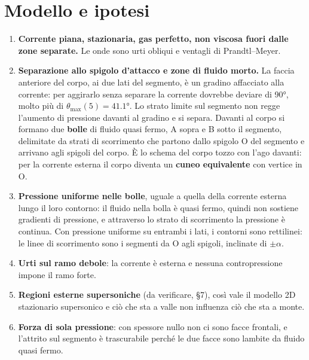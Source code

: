 \documentclass[11pt,a4paper]{article}
\begin{document}
\section{Modello e ipotesi}
\begin{enumerate}
\item \textbf{Corrente piana, stazionaria, gas perfetto, non viscosa fuori dalle zone separate.} Le onde sono urti
  obliqui e ventagli di Prandtl--Meyer.
\item \textbf{Separazione allo spigolo d'attacco e zone di fluido morto.} La faccia anteriore del corpo, ai due lati
  del segmento, è un gradino affacciato alla corrente: per aggirarlo senza separare la corrente dovrebbe deviare di
  \ang{90}, molto più di $\theta_{\max}(5)=\ang{41.1}$. Lo strato limite sul segmento non regge l'aumento di pressione
  davanti al gradino e si separa. Davanti al corpo si formano due \textbf{bolle} di fluido quasi fermo, A sopra e B
  sotto il segmento, delimitate da strati di scorrimento che partono dallo spigolo O del segmento e arrivano agli
  spigoli del corpo. È lo schema del corpo tozzo con l'ago davanti: per la corrente esterna il corpo diventa un
  \textbf{cuneo equivalente} con vertice in O.
\item \textbf{Pressione uniforme nelle bolle}, uguale a quella della corrente esterna lungo il loro contorno: il
  fluido nella bolla è quasi fermo, quindi non sostiene gradienti di pressione, e attraverso lo strato di
  scorrimento la pressione è continua. Con pressione uniforme su entrambi i lati, i contorni sono rettilinei: le
  linee di scorrimento sono i segmenti da O agli spigoli, inclinate di $\pm\alpha$.
\item \textbf{Urti sul ramo debole}: la corrente è esterna e nessuna contropressione impone il ramo forte.
\item \textbf{Regioni esterne supersoniche} (da verificare, §7), così vale il modello 2D stazionario supersonico e
  ciò che sta a valle non influenza ciò che sta a monte.
\item \textbf{Forza di sola pressione}: con spessore nullo non ci sono facce frontali, e l'attrito sul segmento è
  trascurabile perché le due facce sono lambite da fluido quasi fermo.
\end{enumerate}

\end{document}
